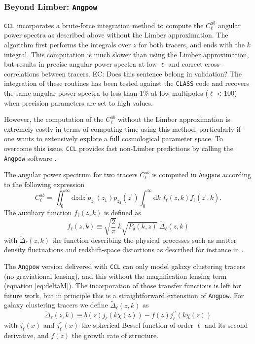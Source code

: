 \documentclass[\docopts]{\docclass}
\newcommand{\elisa}[1]{\textcolor{green!10!orange!90!}{EC: #1}}
\newcommand{\ccl}{{\tt CCL}\xspace}
\newcommand{\class}{{\tt CLASS}\xspace}
\begin{document}
\subsubsection{Beyond Limber: \texttt{Angpow}}
\label{sec:angpow}

\ccl incorporates a brute-force integration method to compute the $C^{ab}_\ell$ angular power spectra as described above without the Limber approximation. The algorithm first performs the integrals over $z$ for both tracers, and ends with the $k$ integral. This computation is much slower than using the Limber approximation, but results in precise angular power spectra at low $\ell$ and correct cross-correlations between tracers. \elisa{Does this sentence belong in validation?} The integration of these routines has been tested against the \class code and recovers the same angular power spectra to less than 1\% at low multipoles ($\ell<100$) when precision parameters are set to high values.

However, the computation of the $C^{ab}_\ell$ without the Limber approximation is extremely costly in terms of computing time using this method, particularly if one wants to extensively explore a full cosmological parameter space. To overcome this issue, \ccl provides fast non-Limber predictions by calling the \texttt{Angpow} software \citep{2017A&A...602A..72C}. 

The angular power spectrum for two tracers $C_{\ell}^{ab}$ is computed in \texttt{Angpow} according to the following expression
\begin{equation}
  C_{\ell}^{ab} = \iint_0^\infty \mathrm{d} z \mathrm{d} z^\prime  p_{z_1}(z_1) p_{z_2}(z^\prime) \int_0^\infty \mathrm{d} k\ f_{\ell}(z, k) f_{\ell}(z^\prime, k).
  \label{eq-clz1z2-obs}
\end{equation}
The auxiliary function $f_\ell(z,k)$ is defined as
\begin{equation}
f_\ell(z,k) \equiv  \sqrt{\frac{2}{\pi}}\  k \sqrt{P_\delta(k,z)}\ \widetilde{\Delta}_\ell(z,k)\label{eq-fell-func}
\end{equation}
with $\widetilde{\Delta}_\ell(z,k)$ the function describing the physical processes such as matter density fluctuations and redshift-space distortions as described for instance in \citet{2008cmb..book.....D,2009PhRvD..80h3514Y,2010PhRvD..82h3508Y, 2011PhRvD..84d3516C,2011PhRvD..84f3505B}.

The \texttt{Angpow} version delivered with \ccl can only model galaxy clustering tracers (no graviational lensing), and this without the magnification lensing term (equation \ref{eq:deltaM}). The incorporation of those transfer functions is left for future work, but in principle this is a straightforward extenstion of \texttt{Angpow}. For galaxy clustering tracers we define $\widetilde{\Delta}_\ell(z,k)$ as 
\begin{equation}
 \widetilde{\Delta}_\ell(z,k) \equiv b(z) j_\ell(k \chi(z)) - f(z) j_\ell^{\prime\prime}(k \chi(z)) 
\end{equation}
with $j_\ell(x)$ and $j_\ell^{\prime\prime}(x)$ the spherical Bessel function of order $\ell$ and its second derivative, and $f(z)$ the growth rate of structure.
\end{document}
